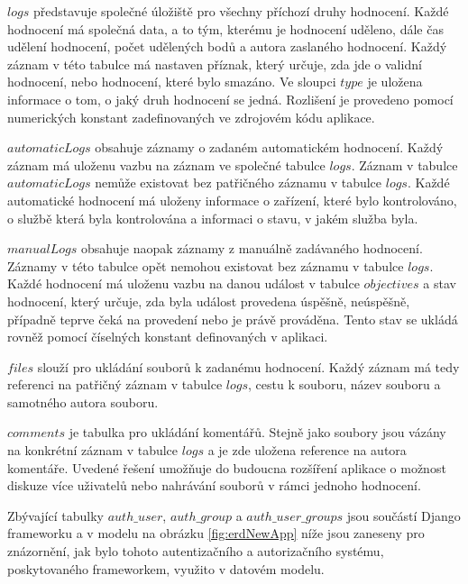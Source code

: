 \documentclass[
  digital, %
  twoside, %
  table,   %
  lof,     %
  lot,     %
]{fithesis3}
\begin{document}
$logs$ představuje společné úložiště pro všechny příchozí druhy hodnocení. Každé hodnocení má společná data, a to tým, kterému je hodnocení uděleno, dále čas udělení hodnocení, počet udělených bodů a autora zaslaného hodnocení. Každý záznam v této tabulce má nastaven příznak, který určuje, zda jde o validní hodnocení, nebo hodnocení, které bylo smazáno. Ve sloupci $type$ je uložena informace o tom, o jaký druh hodnocení se jedná. Rozlišení je provedeno pomocí numerických konstant zadefinovaných ve zdrojovém kódu aplikace.

$automaticLogs$ obsahuje záznamy o zadaném automatickém hodnocení. Každý záznam má uloženu vazbu na záznam ve společné tabulce $logs$. Záznam v tabulce $automaticLogs$ nemůže existovat bez patřičného záznamu v tabulce $logs$. Každé automatické hodnocení má uloženy informace o zařízení, které bylo kontrolováno, o službě která byla kontrolována a informaci o stavu, v jakém služba byla.

$manualLogs$ obsahuje naopak záznamy z manuálně zadávaného hodnocení. Záznamy v této tabulce opět nemohou existovat bez záznamu v tabulce $logs$. Každé hodnocení má uloženu vazbu na danou událost v tabulce $objectives$ a stav hodnocení, který určuje, zda byla událost provedena úspěšně, neúspěšně, případně  teprve čeká na provedení nebo je právě prováděna. Tento stav se ukládá rovněž pomocí číselných konstant definovaných v aplikaci.

$files$ slouží pro ukládání souborů k zadanému hodnocení. Každý záznam má tedy referenci na patřičný záznam v tabulce $logs$, cestu k souboru, název souboru a samotného autora souboru.

$comments$ je tabulka pro ukládání komentářů. Stejně jako soubory jsou vázány na konkrétní záznam v tabulce $logs$ a je zde uložena reference na autora komentáře. Uvedené řešení umožňuje do budoucna rozšíření aplikace o možnost diskuze více uživatelů nebo nahrávání souborů v rámci jednoho hodnocení.

Zbývající tabulky $auth\_user$, $auth\_group$ a $auth\_user\_groups$ jsou součástí Django frameworku a v modelu na obrázku \ref{fig:erdNewApp} níže jsou zaneseny pro znázornění, jak bylo tohoto autentizačního a autorizačního systému, poskytovaného frameworkem, využito v datovém modelu.
\end{document}
